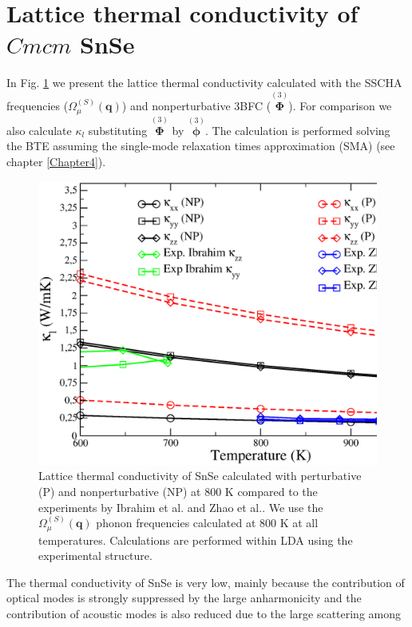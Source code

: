 \section{Lattice thermal conductivity of $Cmcm$ SnSe}

In Fig. \ref{thermal-snse} we present the lattice thermal conductivity calculated with the SSCHA frequencies ($\Omega^{(S)}_{\mu}(\boldsymbol{q})$) and nonperturbative 3BFC ($\overset{(3)}{\boldsymbol{\Phi}}$). For comparison 
we also calculate $\kappa_{l}$ substituting $\overset{(3)}{\boldsymbol{\Phi}}$ by $\overset{(3)}{\boldsymbol{\phi}}$. The calculation is performed solving the BTE assuming the single-mode relaxation times approximation (SMA) (see 
chapter \ref{Chapter4}).
\begin{figure}[h]
\includegraphics[width=\linewidth]{Figures/tk-snse.eps}
\caption[Lattice thermal conductivity of SnSe]{Lattice thermal conductivity of SnSe calculated with perturbative (P) and nonperturbative (NP) at $800$ K compared to the experiments by Ibrahim et al.\cite{ibrahim2017reinvestigation} 
and Zhao et al.\cite{zhao2014ultralow}. We use the $\Omega^{(S)}_{\mu}(\mathbf{q})$ phonon frequencies calculated at $800$ K at all temperatures. Calculations are performed within LDA using the experimental structure.}
\label{thermal-snse}
\end{figure}
The thermal conductivity of SnSe is very low, mainly because the contribution of optical modes is strongly suppressed by the large anharmonicity and the contribution of acoustic modes is also reduced due to the large scattering among 
